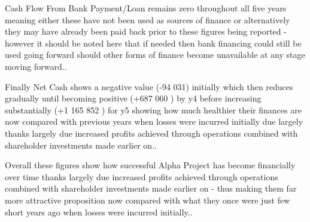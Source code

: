  Cash Flow From Bank Payment/Loan remains zero throughout all five years meaning either these have not been used as sources of finance or alternatively they may have already been paid back prior to these figures being reported - however it should be noted here that if needed then bank financing could still be used going forward should other forms of finance become unavailable at any stage moving forward..  

 Finally Net Cash shows a negative value (-94 031) initially which then reduces gradually until becoming positive (+687 060 ) by y4 before increasing substantially (+1 165 852 ) for y5 showing how much healthier their finances are now compared with previous years when losses were incurred initially due largely thanks largely due increased profits achieved through operations combined with shareholder investments made earlier on..   

 Overall these figures show how successful Alpha Project has become financially over time thanks largely due increased profits achieved through operations combined with shareholder investments made earlier on - thus making them far more attractive proposition now compared with what they once were just few short years ago when losses were incurred initially..